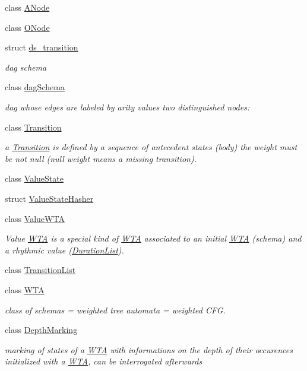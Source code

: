 \begin{DoxyCompactItemize}
class \mbox{\hyperlink{classANode}{A\+Node}}
\item 
class \mbox{\hyperlink{classONode}{O\+Node}}
\item 
struct \mbox{\hyperlink{structds__transition}{ds\+\_\+transition}}
\begin{DoxyCompactList}\small\item\em dag schema \end{DoxyCompactList}\item 
class \mbox{\hyperlink{classdagSchema}{dag\+Schema}}
\begin{DoxyCompactList}\small\item\em dag whose edges are labeled by arity values two distinguished nodes\+: \end{DoxyCompactList}\item 
class \mbox{\hyperlink{classTransition}{Transition}}
\begin{DoxyCompactList}\small\item\em a \mbox{\hyperlink{classTransition}{Transition}} is defined by a sequence of antecedent states (body) the weight must be not null (null weight means a missing transition). \end{DoxyCompactList}\item 
class \mbox{\hyperlink{classValueState}{Value\+State}}
\item 
struct \mbox{\hyperlink{structValueStateHasher}{Value\+State\+Hasher}}
\item 
class \mbox{\hyperlink{classValueWTA}{Value\+W\+TA}}
\begin{DoxyCompactList}\small\item\em Value \mbox{\hyperlink{classWTA}{W\+TA}} is a special kind of \mbox{\hyperlink{classWTA}{W\+TA}} associated to an initial \mbox{\hyperlink{classWTA}{W\+TA}} (schema) and a rhythmic value (\mbox{\hyperlink{classDurationList}{Duration\+List}}). \end{DoxyCompactList}\item 
class \mbox{\hyperlink{classTransitionList}{Transition\+List}}
\item 
class \mbox{\hyperlink{classWTA}{W\+TA}}
\begin{DoxyCompactList}\small\item\em class of schemas = weighted tree automata = weighted C\+FG. \end{DoxyCompactList}\item 
class \mbox{\hyperlink{classDepthMarking}{Depth\+Marking}}
\begin{DoxyCompactList}\small\item\em marking of states of a \mbox{\hyperlink{classWTA}{W\+TA}} with informations on the depth of their occurences initialized with a \mbox{\hyperlink{classWTA}{W\+TA}}, can be interrogated afterwards \end{DoxyCompactList}\end{DoxyCompactItemize}

